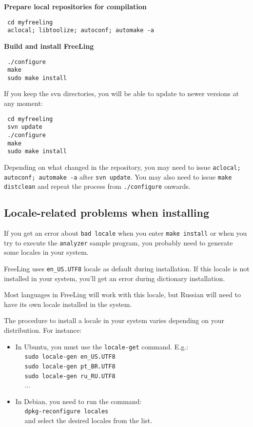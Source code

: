 \documentclass[a4paper]{book}
\begin{document}
\begin{list}{{\bf {}.}}{\leftmargin=1.5em}
\item {\bf Prepare local repositories for compilation}
\begin{verbatim}
 cd myfreeling
 aclocal; libtoolize; autoconf; automake -a
\end{verbatim}

\item {\bf Build and install FreeLing}
\begin{verbatim}
 ./configure
 make
 sudo make install
\end{verbatim}

\end{list}

\noindent If you keep the svn directories, you will be able to update
to newer versions at any moment:
\begin{verbatim}
 cd myfreeling
 svn update
 ./configure
 make
 sudo make install
\end{verbatim}
 Depending on what changed in the repository, you may need to issue
 \verb#aclocal; autoconf; automake -a# after \verb#svn update#.  You
 may also need to issue \verb#make distclean# and repeat the process
 from \verb#./configure# onwards.

\subsection{Locale-related problems when installing}

  If you get an error about {\tt bad locale} when you enter {\tt make
    install} or when you try to execute the {\tt analyzer} sample
  program, you probably need to generate some locales in your system.
  
  FreeLing uses \verb#en_US.UTF8# locale as default during
  installation. If this locale is not installed in your system, you'll
  get an error during dictionary installation.

  Most languages in FreeLing will work with this locale, but Russian
  will need to have its own locale installed in the system.

  The procedure to install a locale in your system varies depending on
  your distribution. For instance:
 \begin{itemize}
  \item In Ubuntu, you must use the \verb#locale-get# command. E.g.: \\
    ~~ \verb#sudo locale-gen en_US.UTF8#\\
    ~~ \verb#sudo locale-gen pt_BR.UTF8#\\
    ~~ \verb#sudo locale-gen ru_RU.UTF8#\\
    ~~ ...

   \item In Debian, you need to run the command: \\
     ~~ \verb#dpkg-reconfigure locales#\\ 
     ~~ and select the desired locales from the list.
  \end{itemize}
\end{document}
